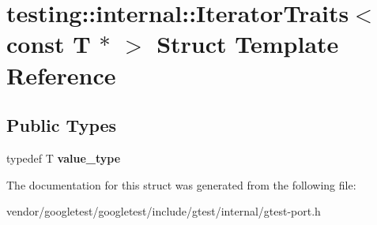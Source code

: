 \hypertarget{structtesting_1_1internal_1_1_iterator_traits_3_01const_01_t_01_5_01_4}{}\section{testing\+:\+:internal\+:\+:Iterator\+Traits$<$ const T $\ast$ $>$ Struct Template Reference}
\label{structtesting_1_1internal_1_1_iterator_traits_3_01const_01_t_01_5_01_4}
\subsection*{Public Types}
\begin{DoxyCompactItemize}
\item 
\mbox{\label{structtesting_1_1internal_1_1_iterator_traits_3_01const_01_t_01_5_01_4_ae7c8867223e106f374b56a7dc4a85547}} 
typedef T {\bfseries value\+\_\+type}
\end{DoxyCompactItemize}


The documentation for this struct was generated from the following file\+:\begin{DoxyCompactItemize}
\item 
vendor/googletest/googletest/include/gtest/internal/gtest-\/port.\+h\end{DoxyCompactItemize}
